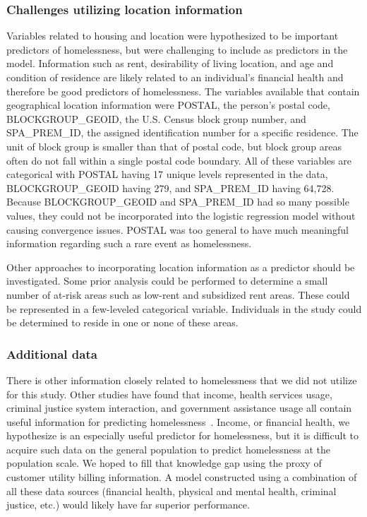\documentclass[10pt,letterpaper]{article}
\begin{document}
\subsubsection*{Challenges utilizing location information}
Variables related to housing and location were hypothesized to be important predictors of homelessness, but were challenging to include as predictors in the model. Information such as rent, desirability of living location, and age and condition of residence are likely related to an individual's financial health and therefore be good predictors of homelessness. The variables available that contain geographical location information were POSTAL, the person's postal code, BLOCKGROUP\_GEOID, the U.S. Census block group number, and SPA\_PREM\_ID, the assigned identification number for a specific residence. The unit of block group is smaller than that of postal code, but block group areas often do not fall within a single postal code boundary. All of these variables are categorical with POSTAL having 17 unique levels represented in the data, BLOCKGROUP\_GEOID having 279, and SPA\_PREM\_ID having 64,728. Because BLOCKGROUP\_GEOID and SPA\_PREM\_ID had so many possible values, they could not be incorporated into the logistic regression model without causing convergence issues. POSTAL was too general to have much meaningful information regarding such a rare event as homelessness. 

Other approaches to incorporating location information as a predictor should be investigated. Some prior analysis could be performed to determine a small number of at-risk areas such as low-rent and subsidized rent areas. These could be represented in a few-leveled categorical variable. Individuals in the study could be determined to reside in one or none of these areas.

\subsubsection*{Additional data}
There is other information closely related to homelessness that we did not utilize for this study. Other studies have found that income, health services usage, criminal justice system interaction, and government assistance usage all contain useful information for predicting homelessness~\cite{byrne2020classification,flaming2011crisis,hong2018applications,shinn2013efficient,vanberlo2021interpretable}. Income, or financial health, we hypothesize is an especially useful predictor for homelessness, but it is difficult to acquire such data on the general population to predict homelessness at the population scale. We hoped to fill that knowledge gap using the proxy of customer utility billing information. A model constructed using a combination of all these data sources (financial health, physical and mental health, criminal justice, etc.) would likely have far superior performance. 
\end{document}
